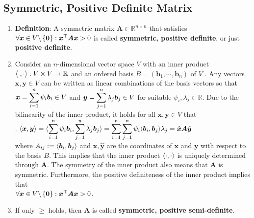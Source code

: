 \subsection{Symmetric, Positive Definite Matrix}

\begin{enumerate}
    \item \textbf{Definition}: A symmetric matrix $\bm{A} \in \mathbb{R}^{n\times n}$ that satisfies $\forall \bm{x} \in V \backslash \left\{\bm{0}\right\} : \bm{x}^\top \bm{Ax} > 0$ is called \textbf{symmetric, positive definite}, or just \textbf{positive definite}.
    \hfill \cite{mfml/book/mml/Deisenroth-Faisal-Ong}

    \item Consider an $n$-dimensional vector space $V$ with an inner product $\langle\cdot, \cdot\rangle : V \times V \to \mathbb{R}$ and an ordered basis $B = (\bm{b}_1, \cdots , \bm{b}_n)$ of $V$ . 
    Any vectors $\bm{x}, \bm{y} \in  V$ can be written as linear combinations of the basis vectors so that $\bm{x} = \displaystyle\sum^n _{i=1} \psi _i \bm{b}_i \in  V$ and $\bm{y} = \displaystyle\sum ^n _{j=1} \lambda _j \bm{b}_j \in  V$ for suitable $\psi _i , \lambda _j \in  \mathbb{R}$. 
    Due to the bilinearity of the inner product, it holds for all $\bm{x}, \bm{y} \in  V$ that
    \hfill \cite{mfml/book/mml/Deisenroth-Faisal-Ong}
    \\
    .\hfill
    $
        \langle\bm{x}, \bm{y}\rangle
        = \langle
            \displaystyle\sum^n _{i=1} \psi _i \bm{b}_i,
            \displaystyle\sum ^n _{j=1} \lambda _j \bm{b}_j
        \rangle
        = \displaystyle\sum^n _{i=1} \displaystyle\sum ^n _{j=1} \psi _i \langle\bm{b}_i, \bm{b}_j\rangle \lambda _j
        = \hat{\bm{x}} \bm{A} \hat{\bm{y}}
    $
    \hfill \cite{mfml/book/mml/Deisenroth-Faisal-Ong}
    \\
    where $A_{ij} := \langle\bm{b}_i , \bm{b}_j\rangle$ and $\hat{\bm{x}}, \hat{\bm{y}}$ are the coordinates of $\bm{x}$ and $\bm{y}$ with respect to the basis $B$.
    This implies that the inner product $\langle\cdot, \cdot\rangle$ is uniquely determined through $\bm{A}$. 
    The symmetry of the inner product also means that $\bm{A}$ is symmetric. 
    Furthermore, the positive definiteness of the inner product implies that
    \\
    $\forall \bm{x} \in V \backslash \left\{\bm{0}\right\} : \bm{x}^\top \bm{Ax} > 0$.
    \hfill \cite{mfml/book/mml/Deisenroth-Faisal-Ong}

    \item If only $\geq$ holds, then $\bm{A}$ is called \textbf{symmetric, positive semi-definite}.
    \hfill \cite{mfml/book/mml/Deisenroth-Faisal-Ong}


\end{enumerate}
